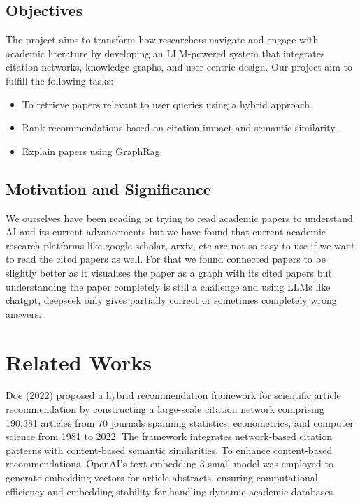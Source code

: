 \documentclass[a4paper,12pt]{article}
\begin{document}
\subsection{Objectives}
The project aims to transform how researchers navigate and engage with academic
literature by developing an LLM-powered system that integrates citation networks,
knowledge graphs, and user-centric design. Our project aim to fulfill the following tasks:
\vspace{-25pt}
\begin{itemize}
    \item To retrieve papers relevant to user queries using a hybrid approach.
    \vspace{-10pt}
    \item Rank recommendations based on citation impact and semantic similarity.
    \vspace{-10pt}
    \item Explain papers using GraphRag.
\end{itemize}

\subsection{Motivation and Significance}
We ourselves have been reading or trying to read academic papers to understand AI
and its current advancements but we have found that current academic research platforms
like google scholar, arxiv, etc are not so easy to use if we want to read the cited
papers as well. For that we found connected papers to be slightly better as it
visualises the paper as a graph with its cited papers but understanding the paper
completely is still a challenge and using LLMs like chatgpt, deepseek only gives
partially correct or sometimes completely wrong answers.
\newpage

\section{Related Works}
Doe (2022) proposed a hybrid recommendation framework for scientific article
recommendation by constructing a large-scale citation network comprising 190,381
articles from 70 journals spanning statistics, econometrics, and computer science
from 1981 to 2022. The framework integrates network-based citation patterns with
content-based semantic similarities. To enhance content-based recommendations,
OpenAI’s text-embedding-3-small model was employed to generate embedding vectors
for article abstracts, ensuring computational efficiency and embedding stability
for handling dynamic academic databases.
\end{document}
